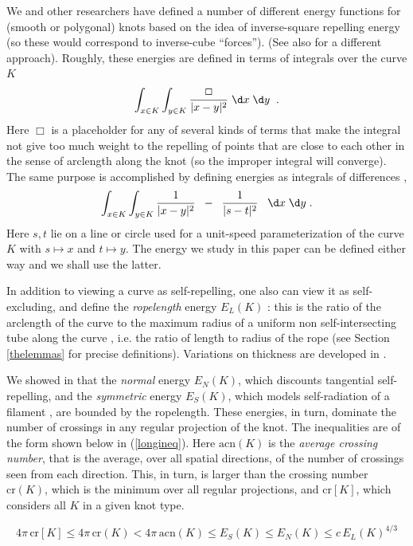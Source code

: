 \documentclass{elsart}
\def\E{E}
\begin{document}
We and other researchers have defined a number of
different energy functions for (smooth or polygonal) knots
\cite{O1,FHW,KS,BO1,BS,BS2,BS3,DEJ,Fu,Lo,O3,O2,O4,Si3,Si4,Si2}
based on the idea of inverse-square repelling energy (so
these would correspond to inverse-cube ``forces'').  (See
also \cite{Mo} for a different approach).  Roughly, these
energies are defined in terms of integrals over the curve
$K$
 $$\int\nolimits_{x \in K}\int\nolimits_{y \in
K}{\frac{\Box}{|x-y|^2}}\;\d x\;\d y\;\;.$$ Here  $\Box$
is a placeholder for any of several kinds of terms that
make the integral not give too much weight to the
repelling of points that are close to each other in the
sense of arclength along the knot (so the improper
integral will converge).  
The same purpose is accomplished by defining energies 
as integrals of
differences \cite{O1,FHW},
$$\int\nolimits_{x \in K}\int\nolimits_{y \in
K}{\frac1{|x-y|^2}}\;\;
-\;\;{\frac1{|s-t|^2}}\;\;\;\d x\;\d y\;.$$
Here $s,t$
lie on a line or circle used for a unit-speed parameterization
of the curve $K$ with $s\mapsto x$ and $t\mapsto y$.  
The energy we study in this paper can be defined
either way \cite{O1,FHW,KS} and we shall use the latter.

In addition to viewing a curve as self-repelling, one
also can view it as self-excluding, and define the {\it
ropelength}
 energy $\E_L(K)$ \cite{BO1,BS2,BS3}: this is the ratio of
the arclength of the curve to the maximum radius of a
uniform non self-intersecting tube  along the curve 
\cite{LSDR}, i.e.{} the ratio of length to radius of the
rope (see Section \ref{thelemmas} for precise
definitions).  Variations on thickness are developed in
\cite{Mo,devrthickness,DEJ2,devrthickness2,maddocks,KS2,meideal,mine}.  

We showed in \cite{BS3} that the {\it normal} energy
$\E_N(K)$, which discounts tangential self-repelling, 
and the  {\it symmetric} energy $\E_S(K)$, which models 
self-radiation of a filament \cite{B2}, are bounded by
the ropelength.  These energies, in turn, dominate the
number of crossings in any regular projection of the
knot.  The inequalities are of the form shown below in
(\ref{longineq}).  Here $\mathrm{acn}(K)$ is the {\it
average crossing number}, that is the average, over all
spatial directions, of the number of crossings seen from
each direction.  This, in turn, is larger than the
crossing number
$\mathrm{cr}(K)$, which is the minimum over all regular
projections, and
$\mathrm{cr}[K]$, which considers all $K$ in a given knot
type.

\begin{equation} 4\pi\,\mathrm{cr}[K] \leq 4\pi\,
\mathrm{cr}(K)< 4
\pi\, \mathrm{acn}(K) \leq
\E_S(K) \leq \E_N(K) \leq c\,\E_L(K)^{4/3}
\label{longineq}
\end{equation}
\end{document}
